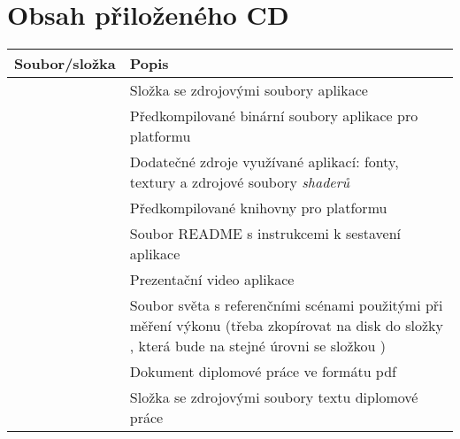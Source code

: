 \chapter{Obsah přiloženého CD}
\def\arraystretch{1.5}
\begin{tabular}{l L{10cm}}
	\textbf{Soubor/složka} & \textbf{Popis} \\ \hline
	 & Složka se zdrojovými soubory aplikace \\
	 & Předkompilované binární soubory aplikace pro platformu  \\
	 & Dodatečné zdroje využívané aplikací: fonty, textury a zdrojové soubory \textit{shaderů} \\
	 & Předkompilované knihovny pro platformu  \\
	 & Soubor README s instrukcemi k sestavení aplikace \\
	 & Prezentační video aplikace \\
	 & Soubor světa s referenčními scénami použitými při měření výkonu (třeba zkopírovat na disk do složky , která bude na stejné úrovni se složkou ) \\
	 & Dokument diplomové práce ve formátu pdf \\
	 & Složka se zdrojovými soubory textu diplomové práce \\
\end{tabular}

